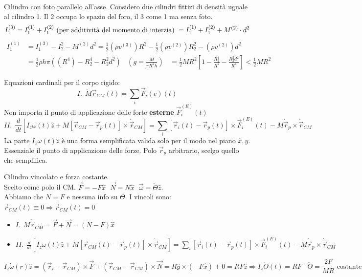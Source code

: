 \begin{example}\label{ess-momento-angolare-corpo-rigido-2}
    Cilindro con foto parallelo all'asse. Considero due cilindri fittizi di densità uguale al cilindro 1. Il 2 
    occupa lo spazio del foro, il 3 come 1 ma senza foto.
    $$            
    I_1^{(3)} = I_1^{(1)} + I_1^{(2)} \text{ (per additività del momento di interzia) } = I_1^{(1)} + I_1^{(2)} + M^{(2)} \cdot d^2\\
    $$
    \begin{equation*}
        \begin{split}
            I_1^{(1)} & = I_1^{(3)} - I_2^{2} - M^{(2)} d^2 = \frac{1}{2}(\rho v^{(3)})R^2 - \frac{1}{2}(\rho v^{(2)})R_2^2 - (\rho v^{(2)})d^2\\
                      & = \frac{1}{2}\rho h \pi((R^4) - R_2^4 - R_2^2 d^2) \:\:\:\:\underline{(g=\frac{M}{\pi R^2h})} \:\:\:\:= \frac{1}{2}MR^2[1 - \frac{R_2^4}{R^2} - \frac{R_2^2d^2}{R^4}] < \frac{1}{2}MR^2
        \end{split}
    \end{equation*} 
\end{example}
\hspace{-15pt}Equazioni cardinali per il corpo rigido:
$$
I. \:\: \ddot{M}\vec{r}_{CM}(t) = \sum_{i}\vec{F}_i(e)(t)
$$
Non importa il punto di applicazione delle forte \textbf{esterne} $\vec{F}_i^{(E)}(t)$
$$
II. \:\: \frac{d}{dt}[I_z\omega(t)\hat{z} + M[\vec{r}_{CM} - \vec{r}_p(t)] \times \dot{\vec{r}}_{CM}] = \sum_{i}[\vec{r}_i(t) - \vec{r}_p(t)] \times \vec{F}_i^{(E)}(t) - M\dot{\vec{r}}_p  \times \dot{\vec{r}}_{CM} 
$$
La parte $I_z\omega(t)\hat{z}$ è una forma semplificata valida solo per il modo nel piano $\hat{x}, \hat{y}$. Essenziale il punto di applicazione delle forze.
Polo $\vec{r}_p$ arbitrario, scelgo quello che semplifica.

\begin{example}\label{ess-momento-angolare-corpo-rigido-3}
    Cilindro vincolato e forza costante. \\
    Scelto come polo il CM. $\vec{F} = - F\hat{x} \:\:\: \vec{N}= N \hat{x} \:\:\: \vec{\omega} = \dot{\Theta}\hat{z}$.\\
    Abbiamo che $N = F$ e nessuna info su $\Theta$. I vincoli sono: $\vec{r}_{CM}(t) \equiv 0 \Rightarrow \ddot{\vec{r}}_{CM}(t) = 0$
    \begin{itemize}
        \item $I. \:\: M\ddot{\vec{r}}_{CM} = \vec{F} + \vec{N} = (N - F)\hat{x}$
        \item $II. \:\: \frac{d}{dt}[I_z\omega(t)\hat{z} + M[\vec{r}_{CM}(t) - \vec{r}_p(t)] \times \dot{\vec{r}}_{CM}] = \sum_{i}[\vec{r}_i(t) - \vec{r}_p(t)] \times \vec{F}_i^(E)(t) - M\dot{\vec{r}}_p \times \dot{\vec{r}}_{CM}$
    \end{itemize}
    $$I_z\dot{\omega}(r)\hat{z} = (\vec{r}_i - \vec{r}_{CM}) \times \vec{F} + (\vec{r}_{CM} - \vec{r}_{CM}) \times \vec{N} = R\hat{y} \times (-F\hat{x}) + 0 = RF\hat{z} \Rightarrow I_z\ddot{\Theta}(t) = RF \hspace{10pt}\ddot{\Theta} = \frac{2F}{MR} \text{ costante}$$
\end{example}

